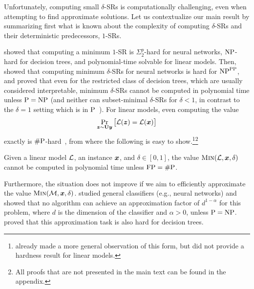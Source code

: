 

Unfortunately, computing small $\delta$-SRs is computationally challenging, even when attempting to find approximate solutions. Let us contextualize our main result by summarizing first what is known about the complexity of computing $\delta$-SRs and their deterministic predecessors, $1$-SRs.  

\citet{NEURIPS2020_b1adda14} showed that computing a minimum $1$-SR is $\Sigma_2^p$-hard for neural networks, $\mathrm{NP}$-hard for decision trees, and polynomial-time solvable for linear models. Then, \citet[Theorem 2.4]{Waldchen_MacDonald_Hauch_Kutyniok_2021} showed that computing minimum $\delta$-SRs for neural networks is hard for $\mathrm{NP}^{\mathrm{PP}}$, and \citet{NEURIPS2022_b8963f6a} proved that even for the restricted class of decision trees, which are usually considered interpretable, minimum $\delta$-SRs cannot be computed in polynomial time unless $\mathrm{P} = \mathrm{NP}$ (and neither can subset-minimal $\delta$-SRs for $\delta < 1$, in contrast to the $\delta = 1$ setting which is in $\mathrm{P}$~\citep{izzaExplainingDecisionTrees2020,roaModelInterpretabilityLens2020}). 
For linear models, even computing the value
\[
    \Pr_{{\bm{z}} \sim \mathbf{U}{{\bm{y}}}}\big[\mathcal{L}({\bm{z}}) = \mathcal{L}({\bm{x}})\big]
\]
exactly is $\mathrm{\#P}$-hard~\citep{NEURIPS2020_b1adda14}, from where the following is easy to show.\footnote{\citet{izzaComputingProbabilisticAbductive2023} already made a more general observation of this form, but did not provide a hardness result for linear models.}\footnote{All proofs that are not presented in the main text can be found in the appendix.}
 
\begin{proposition}\label{prop:hardness}
    Given a linear model $\mathcal{L}$, an instance
    ${\bm{x}}$, and $\delta \in [0,1]$, the value $\operatorname{\textsc{Min}}(\mathcal{L}, {\bm{x}}, \delta)$
    cannot be computed in polynomial time unless $\mathrm{FP} = \mathrm{\#P}$.
\end{proposition}

Furthermore, the situation does not improve if we aim to efficiently approximate the value $\operatorname{\textsc{Min}}(\mathcal{M}, {\bm{x}}, \delta)$. \citet[Theorem 2.5]{Waldchen_MacDonald_Hauch_Kutyniok_2021} studied general classifiers (e.g., neural networks) and showed that no algorithm can achieve an approximation factor of $d^{1-\alpha}$ for this problem, where $d$ is the dimension of the classifier and $\alpha > 0$, unless $\mathrm{P} = \mathrm{NP}$. \citet{Kozachinskiy_2023} proved that this approximation task is also hard for decision trees.


